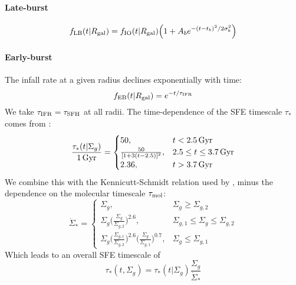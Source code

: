 \documentclass[twocolumn,linenumbers,twocolappendix]{aastex631}
\begin{document}
\paragraph{Late-burst}
\begin{equation}
    f_{\rm LB}(t|R_{\rm gal}) = f_{\rm IO}(t|R_{\rm gal}) \Big(1 + A_b e^{-(t-t_b)^2/2\sigma_b^2} \Big)
    \label{eq:lateburst-sfh}
\end{equation}

\paragraph{Early-burst} The infall rate at a given radius declines exponentially with time:
\begin{equation}
    f_{\rm EB}(t|R_{\rm gal}) = e^{-t/\tau_{\rm IFR}}
    \label{eq:earlyburst-ifr}
\end{equation}
We take $\tau_{\rm IFR} = \tau_{\rm SFH}$ at all radii.
The time-dependence of the SFE timescale $\tau_*$ comes from \citet{Conroy2022-ThickDisk}:
\begin{equation}
    \frac{\tau_*(t|\Sigma_g)}{1\,\rm{Gyr}} =
    \begin{cases}
        50, & t < 2.5\,\rm{Gyr} \\
        \frac{50}{[1+3(t-2.5)]^2}, & 2.5\leq t \leq 3.7\,\rm{Gyr} \\
        2.36, & t > 3.7\,\rm{Gyr}
    \end{cases}
    \label{eq:earlyburst-conroy22}
\end{equation}
We combine this with the Kennicutt-Schmidt relation used by \citet{Johnson2021-Migration}, minus the dependence on the molecular timescale $\tau_{\rm mol}$:
\begin{equation}
    \dot \Sigma_* = 
    \begin{cases}
        \Sigma_g, & \Sigma_g \geq \Sigma_{g,2} \\
        \Sigma_g \Big(\frac{\Sigma_g}{\Sigma_{g,2}}\Big)^{2.6}, & \Sigma_{g,1} \leq \Sigma_g \leq \Sigma_{g,2} \\
        \Sigma_g \Big(\frac{\Sigma_{g,1}}{\Sigma_{g,2}}\Big)^{2.6} \Big(\frac{\Sigma_g}{\Sigma_{g,1}}\Big)^{0.7}, & \Sigma_g \leq \Sigma_{g,1}
    \end{cases}
    \label{eq:kennicutt-schmidt}
\end{equation}
Which leads to an overall SFE timescale of
\begin{equation}
    \tau_*(t,\Sigma_g) = \tau_*(t|\Sigma_g) \frac{\Sigma_g}{\dot \Sigma_*}
    \label{eq:earlyburst-taustar}
\end{equation}
\end{document}
